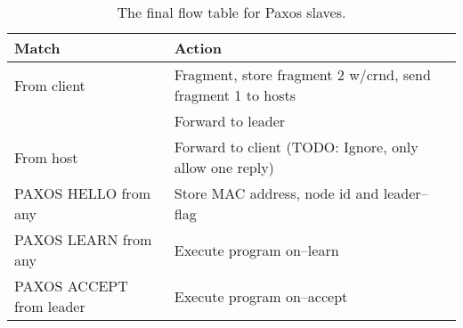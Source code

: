 \begin{table}[H]
  \centering
  \begin{tabular}{|l|l|}
    \hline \textbf{Match} & \textbf{Action} \\
    \hline From client & Fragment, store fragment 2 w/crnd, send fragment 1 to hosts \\
                       & Forward to leader \\
    \hline From host & Forward to client (TODO: Ignore, only allow one reply) \\
    \hline PAXOS HELLO from any & Store MAC address, node id and leader--flag \\
    \hline PAXOS LEARN from any & Execute program on--learn \\
    \hline PAXOS ACCEPT from leader & Execute program on--accept \\
    \hline
  \end{tabular}
  \caption{The final flow table for Paxos slaves.}
  \label{table:complete.match.slave}
\end{table}

